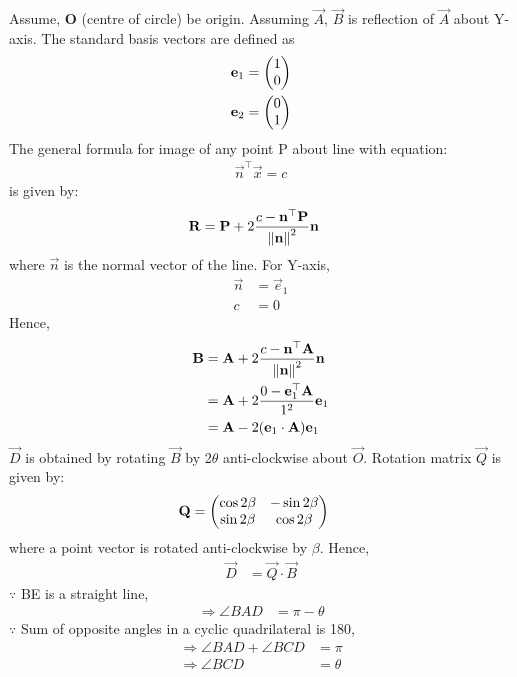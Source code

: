 \documentclass[journal,12pt,twocolumn]{IEEEtran}
\begin{document}
Assume, \textbf{O} (centre of circle) be origin.
Assuming $\vec{A}$, $\vec{B}$ is reflection of $\vec{A}$ about Y-axis.
The standard basis vectors are defined as
\begin{align}
    \mathbf{e}_1 & = \begin{pmatrix}1 \\0\end{pmatrix}\\
    \mathbf{e}_2 & = \begin{pmatrix}0 \\1\end{pmatrix}
\end{align}
The general formula for image of any point P about line with equation:
\begin{align}
    \vec{n}^{\top}\vec{x} = c
\end{align}
is given by:
\begin{align}
    \mathbf{R} & =
    \mathbf{P} + 2\frac{c - \mathbf{n}^{\top}\mathbf{P}}{\left\lVert\mathbf{n}\right\rVert^2}\mathbf{n}
\end{align}
where $\vec{n}$ is the normal vector of the line.
For Y-axis,
\begin{align}
    \vec{n} & = \vec{e}_1 \\
    c       & = 0
\end{align}
Hence,\\
\begin{align}
    \mathbf{B} & =
    \mathbf{A} + 2\frac{c - \mathbf{n}^{\top}\mathbf{A}}{\left\lVert\mathbf{n}\right\rVert^2}\mathbf{n}
    \\
            & =
    \mathbf{A} + 2\frac{0 - \mathbf{e}_1^{\top}\mathbf{A}}{1^2}\mathbf{e}_1
    \\
            & =
    \mathbf{A} - 2(\mathbf{e}_1\cdot\mathbf{A})\mathbf{e}_1
\end{align}
$\vec{D}$ is obtained by rotating $\vec{B}$ by 2$\theta$ anti-clockwise about $\vec{O}$.
Rotation matrix $\vec{Q}$ is given by:
\begin{align}
    \mathbf{Q} & = \begin{pmatrix}\cos{2\beta} & -\sin{2\beta} \\ \sin{2\beta} & \cos{2\beta}\end{pmatrix}
\end{align}
where a point vector is rotated anti-clockwise by $\beta$.
Hence,
\begin{align}
    \vec{D} & = \vec{Q}\cdot\vec{B}
\end{align}
$\because$ BE is a straight line,
\begin{align}
        \Rightarrow \angle{BAD} &= \pi - \theta
\end{align}
$\because$ Sum of opposite angles in a cyclic quadrilateral is 180\textdegree,
\begin{align}
        \Rightarrow \angle{BAD} + \angle{BCD} &= \pi \\
        \Rightarrow \angle{BCD} &= \theta
\end{align}
\end{document}
